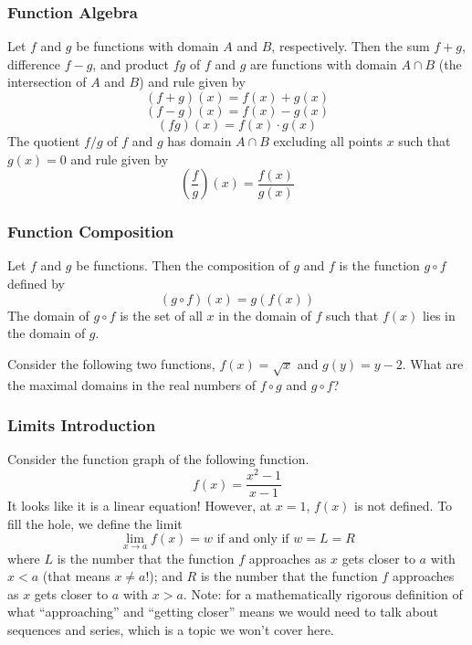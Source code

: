\documentclass[xcolor=dvipsnames]{beamer}
\begin{document}
\begin{frame}
  \frametitle{Function Algebra}
Let $f$ and $g$ be functions with domain $A$ and $B$, respectively.
Then the \alert{sum} $f+g$, \alert{difference} $f-g$, and
\alert{product} $fg$ of $f$ and $g$ are functions with domain
$A\cap{}B$ (the intersection of $A$ and $B$) and rule given by
\begin{equation}
  \label{eq:maichong}
  (f+g)(x)=f(x)+g(x)
\end{equation}
\begin{equation}
  \label{eq:pieshouz}
  (f-g)(x)=f(x)-g(x)
\end{equation}
\begin{equation}
  \label{eq:queebeih}
  (fg)(x)=f(x)\cdot{}g(x)
\end{equation}
The \alert{quotient} $f/g$ of $f$ and $g$ has domain $A\cap{}B$
excluding all points $x$ such that $g(x)=0$ and rule given by
\begin{equation}
  \label{eq:thaochao}
  \left(\frac{f}{g}\right)(x)=\frac{f(x)}{g(x)}
\end{equation}
\end{frame}

\begin{frame}
  \frametitle{Function Composition}
Let $f$ and $g$ be functions. Then the \alert{composition} of $g$ and $f$ is
the function $g\circ{}f$ defined by
\begin{equation}
  \label{eq:aphiepae}
  (g\circ{}f)(x)=g(f(x))
\end{equation}
The domain of $g\circ{}f$ is the set of all $x$ in the domain of $f$
such that $f(x)$ lies in the domain of $g$.

\medskip

Consider the following two functions, $f(x)=\sqrt{x}$ and
  $g(y)=y-2$. What are the maximal domains in the real numbers of
  $f\circ{}g$ and $g\circ{}f$?
\end{frame}

\begin{frame}
  \frametitle{Limits Introduction}
Consider the function graph of the following function.
\begin{equation}
  \label{eq:quiekong}
  f(x)=\frac{x^{2}-1}{x-1}
\end{equation}
It looks like it is a linear equation! However, at $x=1$, $f(x)$ is
not defined. To fill the hole, we define the limit
\begin{equation}
  \label{eq:vaineiro}
  \lim_{x\rightarrow{}a}f(x)=w\mbox{ if and only if }w=L=R
\end{equation}
where $L$ is the number that the function $f$ approaches as $x$ gets
closer to $a$ with $x<a$ (that means $x\neq{}a$!); and $R$ is the
number that the function $f$ approaches as $x$ gets closer to $a$ with
$x>a$. Note: for a mathematically rigorous definition of what
``approaching'' and ``getting closer'' means we would need to
talk about sequences and series, which is a topic we won't cover here.
\end{frame}
\end{document}
